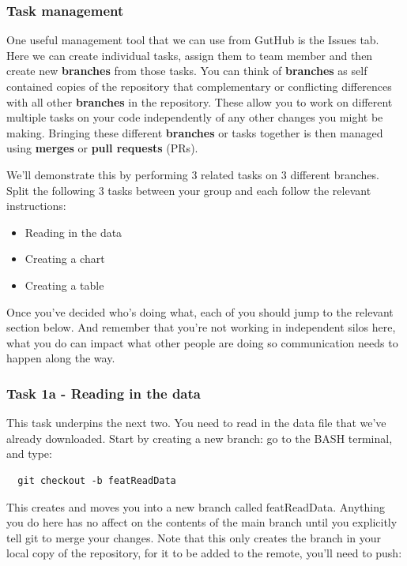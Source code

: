 \documentclass[
  12pt,
]{article}
\providecommand{\tightlist}{%
  \setlength{\itemsep}{0pt}\setlength{\parskip}{0pt}}
\begin{document}
\hypertarget{task-management}{%
\subsubsection{Task management}\label{task-management}}

One useful management tool that we can use from GutHub is the Issues
tab. Here we can create individual tasks, assign them to team member and
then create new \textbf{branches} from those tasks. You can think of
\textbf{branches} as self contained copies of the repository that
complementary or conflicting differences with all other
\textbf{branches} in the repository. These allow you to work on
different multiple tasks on your code independently of any other changes
you might be making. Bringing these different \textbf{branches} or tasks
together is then managed using \textbf{merges} or \textbf{pull requests}
(PRs).

We'll demonstrate this by performing 3 related tasks on 3 different
branches. Split the following 3 tasks between your group and each follow
the relevant instructions:

\begin{itemize}
\tightlist
\item
  Reading in the data
\item
  Creating a chart
\item
  Creating a table
\end{itemize}

Once you've decided who's doing what, each of you should jump to the
relevant section below. And remember that you're not working in
independent silos here, what you do can impact what other people are
doing so communication needs to happen along the way.

\hypertarget{task-1a---reading-in-the-data}{%
\subsubsection{Task 1a - Reading in the
data}\label{task-1a---reading-in-the-data}}

This task underpins the next two. You need to read in the data file that
we've already downloaded. Start by creating a new branch: go to the BASH
terminal, and type:

\begin{verbatim}
  git checkout -b featReadData
\end{verbatim}

This creates and moves you into a new branch called featReadData.
Anything you do here has no affect on the contents of the main branch
until you explicitly tell git to merge your changes. Note that this only
creates the branch in your local copy of the repository, for it to be
added to the remote, you'll need to push:
\end{document}
